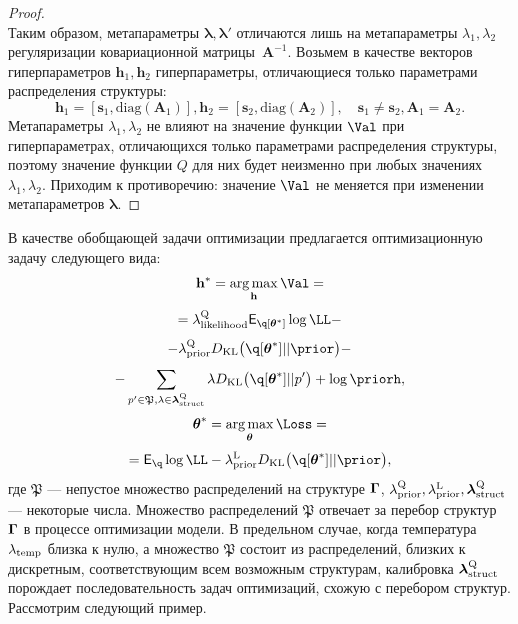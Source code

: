 \begin{proof}
\[\]
Таким образом, метапараметры $\boldsymbol{\lambda},\boldsymbol{\lambda}'$ отличаются лишь на метапараметры  $\lambda_1, \lambda_2$ регуляризации ковариационной матрицы~$\mathbf{A}^{-1}$. 
Возьмем в качестве векторов гиперпараметров $\mathbf{h}_1,\mathbf{h}_2$ гиперпараметры, отличающиеся только параметрами распределения структуры:
\[
    \mathbf{h}_1 = [\mathbf{s}_1, \text{diag}(\mathbf{A}_1)], \mathbf{h}_2 = [\mathbf{s}_2, \text{diag}(\mathbf{A}_2)],\quad \mathbf{s}_1 \neq \mathbf{s}_2, \mathbf{A}_1 = \mathbf{A}_2.
\]
Метапараметры $\lambda_1, \lambda_2$ не влияют на значение функции $\Val$ при гиперпараметрах, отличающихся только параметрами распределения структуры, поэтому значение функции $Q$ для них будет неизменно при любых значениях $\lambda_1, \lambda_2$. Приходим к противоречию: значение $\Val$ не меняется при изменении метапараметров $\boldsymbol{\lambda}$.

\end{proof}

В качестве обобщающей задачи оптимизации предлагается оптимизационную задачу следующего вида:
\begin{equation}
\label{eq:qopt}
\h^{*} = \argmax_{\h} \Val = 
\end{equation}
\[
= \lamLL \E_{\q[\teta^{*}]} \log\LL - 
\]
\[
    - \lamCQ \KL{\q[\teta^{*}]}{\prior} - 
\]
\[
    - \sum_{p' \in \mathfrak{P},\lambda \in \lamS} \lambda\KL{\q[\teta^{*}]}{p'} + \log\priorh, 
\]
\begin{equation}
{\teta}^{*} = \argmax_{\teta} \Loss = 
\end{equation}
\[=
\E_{\q} \log \LL - \lamCL \KL{\q[\teta^{*}]}{\prior},
\]
где $\mathfrak{P}$ --- непустое множество распределений на структуре $\boldsymbol{\Gamma}$, $\lambda_\text{prior}^\text{Q}, \lambda_\text{prior}^\text{L}, \boldsymbol{\lambda}_\text{struct}^\text{Q}$  --- некоторые числа. Множество распределений $\mathfrak{P}$ отвечает за перебор структур $\boldsymbol{\Gamma}$ в процессе оптимизации модели.
В предельном случае, когда температура $\lambda_{\text{temp}}$ близка к нулю, а множество $\mathfrak{P}$ состоит из распределений, близких к дискретным, соответствующим всем возможным структурам, калибровка $\boldsymbol{\lambda}_\text{struct}^\text{Q}$ порождает последовательность задач оптимизаций, схожую с перебором структур. Рассмотрим следующий пример. 


